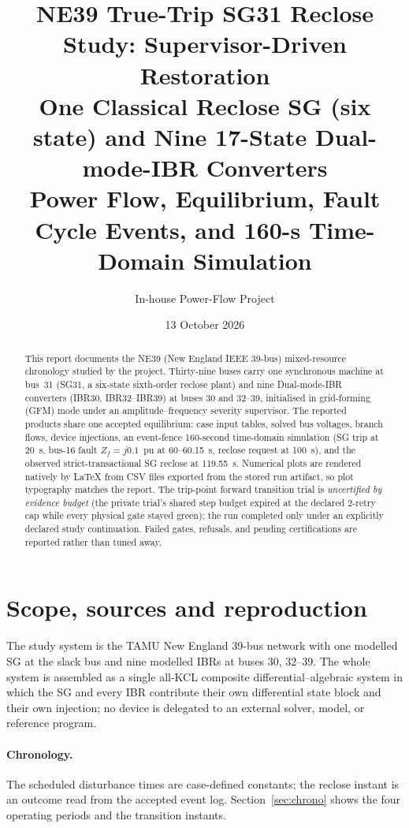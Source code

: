 \documentclass[12pt,a4paper]{article}
\title{\textbf{NE39 True-Trip SG31 Reclose Study: Supervisor-Driven Restoration}\\
\large One Classical Reclose SG (six state) and Nine 17-State Dual-mode-IBR Converters\\[1mm]
\normalsize Power Flow, Equilibrium, Fault Cycle Events, and 160-s Time-Domain Simulation}
\author{In-house Power-Flow Project}
\date{13 October 2026}
\begin{document}
\maketitle

\begin{abstract}
This report documents the NE39 (New England IEEE 39-bus) mixed-resource chronology
studied by the project.  Thirty-nine buses carry one synchronous machine at bus~31
(SG31, a six-state sixth-order reclose plant) and nine Dual-mode-IBR converters
(IBR30, IBR32--IBR39) at buses 30 and 32--39, initialised in grid-forming (GFM) mode
under an amplitude--frequency severity supervisor.
The reported products share one accepted equilibrium: case input tables, solved bus
voltages, branch flows, device injections, an event-fence 160-second time-domain
simulation (SG trip at 20~s, bus-16 fault $Z_f=j0.1$~pu at 60--60.15~s, reclose
request at 100~s), and the observed strict-transactional SG reclose at 119.55~s.
Numerical plots are rendered natively by \LaTeX{} from CSV files exported from the
stored run artifact, so plot typography matches the report.  The trip-point forward
transition trial is \emph{uncertified by evidence budget} (the private trial's
shared step budget expired at the declared 2-retry cap while every physical
gate stayed green); the run
completed only under an explicitly declared study continuation.  Failed gates,
refusals, and pending certifications are reported rather than tuned away.
\end{abstract}

\newpage
\tableofcontents
\newpage

\section{Scope, sources and reproduction}\label{sec:scope}

The study system is the TAMU New England 39-bus network with one modelled SG at
the slack bus and nine modelled IBRs at buses 30, 32--39.  The whole system is
assembled as a single all-KCL composite differential--algebraic system in which
the SG and every IBR contribute their own differential state block and their own
injection; no device is delegated to an external solver, model, or reference
program.

\paragraph{Chronology.}
The scheduled disturbance times are case-defined constants; the reclose instant
is an outcome read from the accepted event log.  Section~\ref{sec:chrono} shows
the four operating periods and the transition instants.
\end{document}
